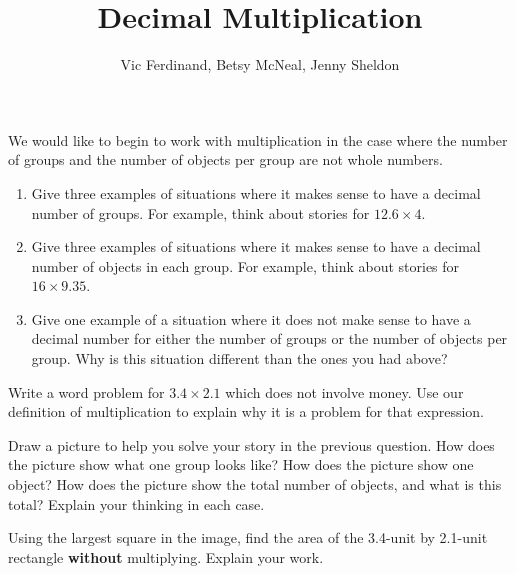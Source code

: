 \documentclass{ximera}
\title{Decimal Multiplication}
\author{Vic Ferdinand, Betsy McNeal, Jenny Sheldon}
\begin{document}
\begin{abstract}  \end{abstract}
\maketitle


\begin{problem}
We would like to begin to work with multiplication in the case where the number of groups and the number of objects per group are not whole numbers.

\begin{enumerate}
\item Give three examples of situations where it makes sense to have a decimal number of groups. For example, think about stories for $12.6 \times 4$.
\item Give three examples of situations where it makes sense to have a decimal number of objects in each group. For example, think about stories for $16 \times 9.35$.
\item Give one example of a situation where it does not make sense to have a decimal number for either the number of groups or the number of objects per group. Why is this situation different than the ones you had above?
\end{enumerate}
\end{problem}


\begin{problem}
Write a word problem for $3.4 \times 2.1$ which does not involve money. Use our definition of multiplication to explain why it is a problem for that expression.
\end{problem}


\begin{problem}
Draw a picture to help you solve your story in the previous question. How does the picture show what one group looks like? How does the picture show one object? How does the picture show the total number of objects, and what is this total? Explain your thinking in each case.
\end{problem}

\newpage

\begin{problem}
Using the largest square in the image, find the area of the 3.4-unit by 2.1-unit rectangle {\bf without} multiplying. Explain your work.

\begin{image}
\end{image}
\end{problem}
\end{document}
